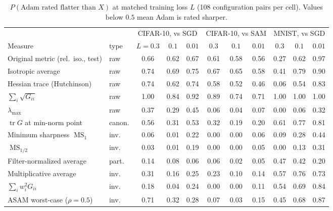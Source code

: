 \documentclass[10pt]{article}
\theoremstyle{remark}
\newcommand{\tr}{\operatorname{tr}}
\newcommand{\MS}{\operatorname{MS}}
\begin{document}
\begin{table}[t]
\centering
\small
\caption{$P(\text{Adam rated flatter than }X)$ at matched training loss $L$ (108 configuration pairs per cell). Values below $0.5$ mean Adam is rated sharper.}
\label{tab:flip}
\setlength{\tabcolsep}{4pt}
\begin{tabular}{llccccccccc}
\toprule
& & \multicolumn{3}{c}{CIFAR-10, vs SGD} & \multicolumn{3}{c}{CIFAR-10, vs SAM} & \multicolumn{3}{c}{MNIST, vs SGD}\\
\cmidrule(lr){3-5}\cmidrule(lr){6-8}\cmidrule(lr){9-11}
Measure & type & $L{=}0.3$ & $0.1$ & $0.01$ & $0.3$ & $0.1$ & $0.01$ & $0.3$ & $0.1$ & $0.01$\\
\midrule
Original metric (rel.\ iso., test) & raw & 0.66 & 0.62 & 0.67 & 0.61 & 0.58 & 0.56 & 0.27 & 0.62 & 0.97\\
Isotropic average & raw & 0.74 & 0.69 & 0.75 & 0.67 & 0.65 & 0.58 & 0.41 & 0.79 & 0.90\\
Hessian trace (Hutchinson) & raw & 0.74 & 0.62 & 0.74 & 0.58 & 0.52 & 0.46 & 0.06 & 0.54 & 0.83\\
$\sum_i\sqrt{G_{ii}}$ & raw & 1.00 & 0.84 & 0.92 & 0.89 & 0.74 & 0.71 & 1.00 & 1.00 & 1.00\\
$\lambda_{\max}$ & raw & 0.37 & 0.29 & 0.45 & 0.06 & 0.04 & 0.07 & 0.00 & 0.06 & 0.32\\
$\tr G$ at min-norm point & canon. & 0.56 & 0.31 & 0.53 & 0.32 & 0.19 & 0.20 & 0.61 & 0.77 & 0.81\\
\midrule
Minimum sharpness $\MS_1$ & inv. & 0.06 & 0.01 & 0.22 & 0.00 & 0.00 & 0.06 & 0.09 & 0.28 & 0.44\\
$\MS_{1/2}$ & inv. & 0.03 & 0.01 & 0.19 & 0.00 & 0.00 & 0.05 & 0.00 & 0.13 & 0.31\\
Filter-normalized average & part. & 0.14 & 0.08 & 0.06 & 0.06 & 0.02 & 0.05 & 0.47 & 0.42 & 0.20\\
Multiplicative average & inv. & 0.31 & 0.16 & 0.25 & 0.23 & 0.10 & 0.14 & 0.57 & 0.76 & 0.73\\
$\sum_iw_i^2G_{ii}$ & inv. & 0.18 & 0.04 & 0.24 & 0.00 & 0.00 & 0.11 & 0.54 & 0.69 & 0.84\\
ASAM worst-case ($\rho{=}0.5$) & inv. & 0.71 & 0.32 & 0.28 & 0.07 & 0.03 & 0.15 & 0.45 & 0.68 & 0.87\\
\bottomrule
\end{tabular}
\end{table}
\end{document}
